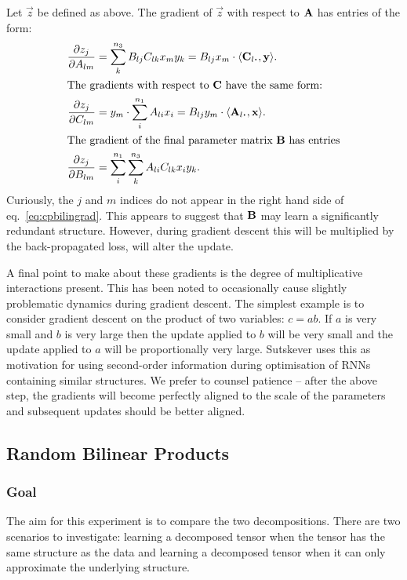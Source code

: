 Let \(\vec{z}\) be defined as above.
The gradient of \(\vec{z}\) with respect to \(\mathbf{A}\) has entries of the form:
\begin{align}
	\frac{\partial z_j}{\partial A_{lm}} &= \sum_k^{n_3}B_{lj}C_{lk}x_my_k 
		= B_{lj}x_m \cdot \langle\vec{C}_{l\midbullet}, \vec{y}\rangle.\\
\intertext{The gradients with respect to \(\mat{C}\) have the same form:}
	\frac{\partial z_j}{\partial C_{lm}} &= y_m \cdot \sum_i^{n_1}A_{li}x_i 
		= B_{lj}y_m \cdot \langle\vec{A}_{l\midbullet}, \vec{x}\rangle.\\
\intertext{The gradient of the final parameter matrix \(\mat{B}\) has entries}
	\frac{\partial z_j}{\partial B_{lm}} &= 
		\sum_i^{n_1}\sum_k^{n_3}A_{li}C_{lk}x_iy_k. \label{eq:cpbilingrad}
\end{align}
Curiously, the \(j\) and \(m\) indices do not appear in the right hand side of 
eq.~\eqref{eq:cpbilingrad}. This appears to suggest that \(\mathbf{B}\) may learn a significantly
redundant structure. However, during gradient descent this will be multiplied by the back-propagated
loss, will alter the update.

A final point to make about these gradients is the degree of multiplicative interactions present.
This has been noted to occasionally cause slightly problematic dynamics during gradient descent. The
simplest example is to consider
gradient descent on the product of two variables: \(c = ab\). If \(a\) is very small and \(b\) is
very large then the update applied to \(b\) will be very small and the update applied to \(a\) will
be proportionally very large. Sutskever \autocite{Sutskever2013} uses this as motivation for using
second-order information during optimisation of RNNs containing similar structures. We prefer to
counsel patience -- after the above step, the gradients will become perfectly aligned to the scale
of the parameters and subsequent updates should be better aligned.


\subsection{Random Bilinear Products}\label{sec:randbilin}
\subsubsection{Goal}
The aim for this experiment is to compare the two decompositions. There are two scenarios to
investigate: learning a decomposed tensor when the tensor has the same structure as the data and
learning a decomposed tensor when it can only approximate the underlying structure. 

